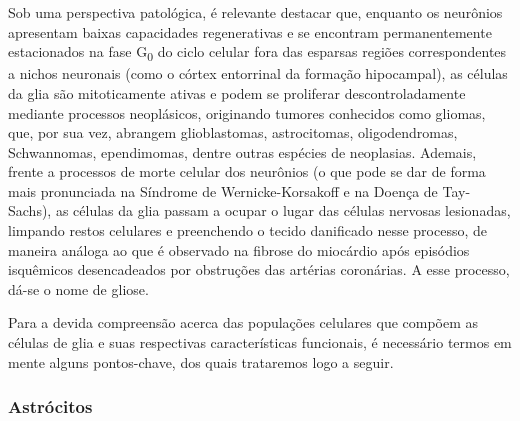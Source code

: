 \documentclass[
]{book}
\theoremstyle{definition}
\theoremstyle{definition}
\theoremstyle{definition}
\theoremstyle{definition}
\theoremstyle{remark}
\begin{document}
Sob uma perspectiva patológica, é relevante destacar que, enquanto os neurônios apresentam baixas capacidades regenerativas e se encontram permanentemente estacionados na fase G\textsubscript{0} do ciclo celular fora das esparsas regiões correspondentes a nichos neuronais (como o córtex entorrinal da formação hipocampal), as células da glia são mitoticamente ativas e podem se proliferar descontroladamente mediante processos neoplásicos, originando tumores conhecidos como gliomas, que, por sua vez, abrangem glioblastomas, astrocitomas, oligodendromas, Schwannomas, ependimomas, dentre outras espécies de neoplasias. Ademais, frente a processos de morte celular dos neurônios (o que pode se dar de forma mais pronunciada na Síndrome de Wernicke-Korsakoff e na Doença de Tay-Sachs), as células da glia passam a ocupar o lugar das células nervosas lesionadas, limpando restos celulares e preenchendo o tecido danificado nesse processo, de maneira análoga ao que é observado na fibrose do miocárdio após episódios isquêmicos desencadeados por obstruções das artérias coronárias. A esse processo, dá-se o nome de gliose.

Para a devida compreensão acerca das populações celulares que compõem as células de glia e suas respectivas características funcionais, é necessário termos em mente alguns pontos-chave, dos quais trataremos logo a seguir.

\hypertarget{astruxf3citos}{%
\subsubsection*{Astrócitos}\label{astruxf3citos}}
\end{document}
